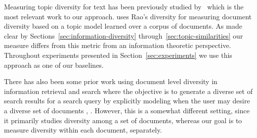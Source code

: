 Measuring topic diversity for text has been previously studied by~\cite{bache:2013} which is the most relevant work to our approach. \cite{bache:2013} uses Rao's diversity \cite{rao:1982} for measuring document diversity based on a topic model learned over a corpus of documents. As made clear by Sections~\ref{sec:information-diversity} through~\ref{sec:topic-similarities} our measure differs from this metric from an information theoretic perspective. Throughout experiments presented in Section~\ref{sec:experiments} we use this approach as one of our baselines. 

There has also been some prior work using document level diversity in information retrieval and search where the objective is to generate a diverse set of search results for a search query by explicitly modeling when the user may desire a diverse set of documents \cite{Welch:2011:SRD:1963405.1963441}, \cite{Gillenwater12discoveringdiverse}. However, this is a somewhat different setting, since it primarily studies diversity among a set of documents, whereas our goal is to measure diversity within each document, separately.

